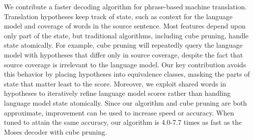 We contribute a faster decoding algorithm for phrase-based machine translation. Translation hypotheses keep track of state, such as context for the language model and coverage of words in the source sentence.  Most features depend upon only part of the state, but traditional algorithms, including cube pruning, handle state atomically.  For example, cube pruning will repeatedly query the language model with hypotheses that differ only in source coverage, despite the fact that source coverage is irrelevant to the language model. Our key contribution avoids this behavior by placing hypotheses into equivalence classes, masking the parts of state that matter least to the score.  Moreover, we exploit shared words in hypotheses to iteratively refine language model scores rather than handling language model state atomically.  Since our algorithm and cube pruning are both approximate, improvement can be used to increase speed or accuracy.  When tuned to attain the same accuracy, our algorithm is 4.0-7.7 times as fast as the Moses decoder with cube pruning.
